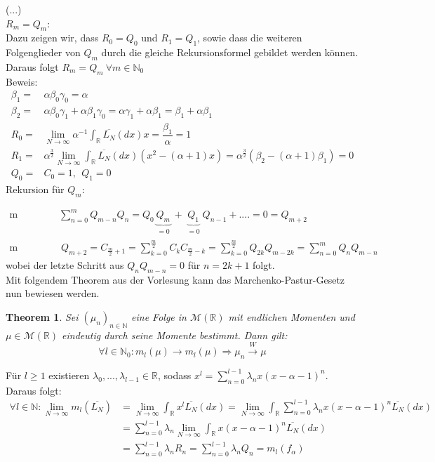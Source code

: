 \documentclass[a4paper, 11pt]{scrreprt}
\newtheorem{theorem}[defi]{Theorem}
\newcommand{\RR}{\mathbb{R}}
\newcommand{\NN}{\mathbb{N}}
\begin{document}
(...)\\






{$ R_m=Q_m $:}\\
Dazu zeigen wir, dass $ R_0=Q_0 $ und $ R_1=Q_1 $, sowie dass die weiteren Folgenglieder von $ Q_m $ durch die gleiche Rekursionsformel gebildet werden können. Daraus folgt $ R_m=Q_m ~ \forall m \in \NN_0$ \\

Beweis: \begin{align*}
\beta_1=& \alpha \beta_0 \gamma_0 = \alpha \\
\beta_2=& \alpha \beta_0 \gamma_1 + \alpha \beta_1 \gamma_0 = \alpha \gamma_1 + \alpha \beta_1 = \beta_1 + \alpha \beta_1  \\
R_0 =& \lim_{N \to \infty} \alpha^{-1} \int_{\RR}\overline{L_{N}}(dx)x = \dfrac{\beta_1}{\alpha}=1 \\
R_1 =& \alpha^{\frac{3}{2}} \lim_{N \to \infty}\int_{\RR}\overline{L_{N}}(dx)(x^2 - (\alpha +1)x)= \alpha^{\frac{3}{2}} (\beta_2 - (\alpha+1)\beta_1)=0 \\
Q_0=& C_0 =1, ~~Q_1=0
\end{align*}
Rekursion für $ Q_m: $

\begin{align*}
\text{m ungerade:}& \sum_{n=0}^m Q_{m-n}Q_n= Q_0 \underbrace{Q_m}_{\substack{=0}} + \underbrace{Q_1}_{\substack{=0}}Q_{n-1}+....= 0=Q_{m+2}\\
\text {m gerade:}&~ Q_{m+2}= C_{\frac{m}{2}+1}= \sum_{k=0}^{\frac{m}{2}} C_k C_{\frac{m}{2}-k}=\sum_{k=0}^{\frac{m}{2}} Q_{2k}Q_{m-2k}=\sum_{n=0}^{m}Q_n Q_{m-n}
\end{align*}
wobei der letzte Schritt aus $ Q_n Q_{m-n}=0 $ für $ n=2k+1 $ folgt.\\

Mit folgendem Theorem aus der Vorlesung kann das Marchenko-Pastur-Gesetz nun bewiesen werden.

\begin{theorem}
Sei \((\mu_n)_{n \in \NN}\) eine Folge in $\mathcal{M}(\RR)$ mit endlichen Momenten und $\mu \in \mathcal{M}(\RR)$ eindeutig durch seine Momente bestimmt. Dann gilt:
\[\forall l \in \NN_0: m_l(\mu) \rightarrow m_l(\mu) \Rightarrow \mu_n \overset{W}{\rightarrow} \mu\]
\end{theorem}

Für $l \geq 1$ existieren $\lambda_0,...,\lambda_{l-1} \in \RR$, sodass $x^l = \sum_{n=0}^{l-1} \lambda_n x (x-\alpha-1)^n$. Daraus folgt:
\begin{align}
\forall l \in \NN: \lim_{N \to \infty} m_l(\overline{L_{N}}) 
&= \lim_{N \to \infty} \int_\RR x^l \overline{L_{N}}(dx)
= \lim_{N \to \infty} \int_\RR \sum_{n=0}^{l-1} \lambda_n x (x-\alpha-1)^n \overline{L_{N}}(dx) \\
&= \sum_{n=0}^{l-1} \lambda_n \lim_{N \to \infty} \int_\RR x (x-\alpha-1)^n \overline{L_{N}}(dx) \\
&= \sum_{n=0}^{l-1} \lambda_n R_n
= \sum_{n=0}^{l-1} \lambda_n Q_n = m_l(f_\alpha)
\end{align}
\end{document}
